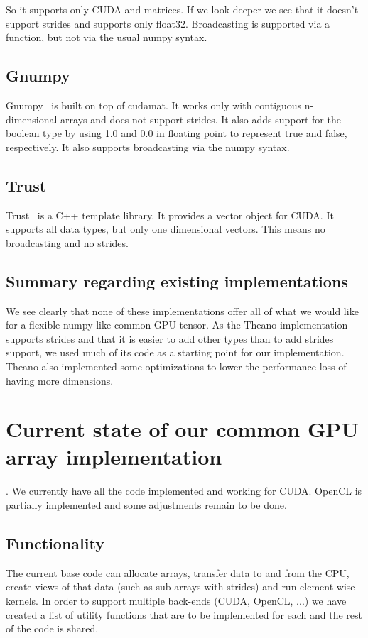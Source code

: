 \documentclass{article} %
\begin{document}
So it supports only CUDA and matrices. 
If we look deeper we see that it doesn't support strides and supports only float32. 
Broadcasting is supported via a function, but not via the usual numpy syntax.

\subsection{Gnumpy}
Gnumpy~\citep{gnumpy-TR2010} is built on top of cudamat.
It works only with contiguous n-dimensional arrays and does not support strides.
It also adds support for the boolean type by using 1.0 and 0.0 in floating point to represent true and false, respectively. 
It also supports broadcasting via the numpy syntax.

\subsection{Trust}
Trust~\citep{Thrust} is a C++ template library.
It provides a vector object for CUDA.
It supports all data types, but only one dimensional vectors.
This means no broadcasting and no strides.

\subsection{Summary regarding existing implementations}
We see clearly that none of these implementations offer all of what we would like for a flexible numpy-like common GPU tensor.
As the Theano implementation supports strides and that it is easier to add other types than to add strides support, we used much of its code as a starting point for our implementation.
Theano also implemented some optimizations to lower the performance loss of having more dimensions.

\section{Current state of our common GPU array implementation}
\label{sec:currentimpl}.
We currently have all the code implemented and working for CUDA.
OpenCL is partially implemented and some adjustments remain to be done.

\subsection{Functionality}

The current base code can allocate arrays, transfer data to and from the CPU, create views of that data (such as sub-arrays with strides) and run element-wise kernels.
In order to support multiple back-ends (CUDA, OpenCL, ...) we have created a list of utility functions that are to be implemented for each 
and the rest of the code is shared.
\end{document}
